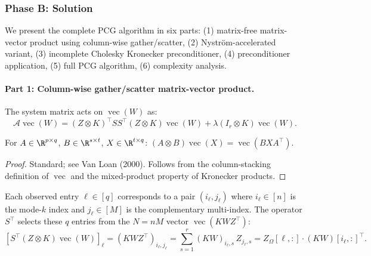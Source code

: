 \subsubsection*{Phase B: Solution}

We present the complete PCG algorithm in six parts: (1) matrix-free matrix-vector
product using column-wise gather/scatter, (2) Nystr\"om-accelerated variant,
(3) incomplete Cholesky Kronecker preconditioner, (4) preconditioner application,
(5) full PCG algorithm, (6) complexity analysis.

\bigskip

\paragraph{Part 1: Column-wise gather/scatter matrix-vector product.}

The system matrix acts on $\operatorname{vec}(W)$ as:
\[
  \mathcal{A}\operatorname{vec}(W)
  = (Z \otimes K)^\top SS^\top(Z \otimes K)\operatorname{vec}(W)
  + \lambda(I_r \otimes K)\operatorname{vec}(W).
\]

\begin{lemma}\label{lem:p10-kronvec}
For $A \in \R^{p \times q}$, $B \in \R^{s \times t}$, $X \in \R^{t \times q}$:
$(A \otimes B)\operatorname{vec}(X) = \operatorname{vec}(BXA^\top)$.
\end{lemma}

\begin{proof}
Standard; see Van Loan (2000). Follows from the column-stacking definition
of $\operatorname{vec}$ and the mixed-product property of Kronecker products.
\end{proof}

\begin{remark}\label{rem:p10-obs}
Each observed entry $\ell \in [q]$ corresponds to a pair $(i_\ell, j_\ell)$
where $i_\ell \in [n]$ is the mode-$k$ index and $j_\ell \in [M]$ is the
complementary multi-index. The operator $S^\top$ selects these $q$ entries
from the $N = nM$ vector $\operatorname{vec}(KWZ^\top)$:
\[
  [S^\top(Z \otimes K)\operatorname{vec}(W)]_\ell = (KWZ^\top)_{i_\ell, j_\ell}
  = \sum_{s=1}^r (KW)_{i_\ell, s}\,Z_{j_\ell, s}
  = Z_\Omega[\ell,:]\cdot(KW)[i_\ell,:]^\top.
\]
\end{remark}

